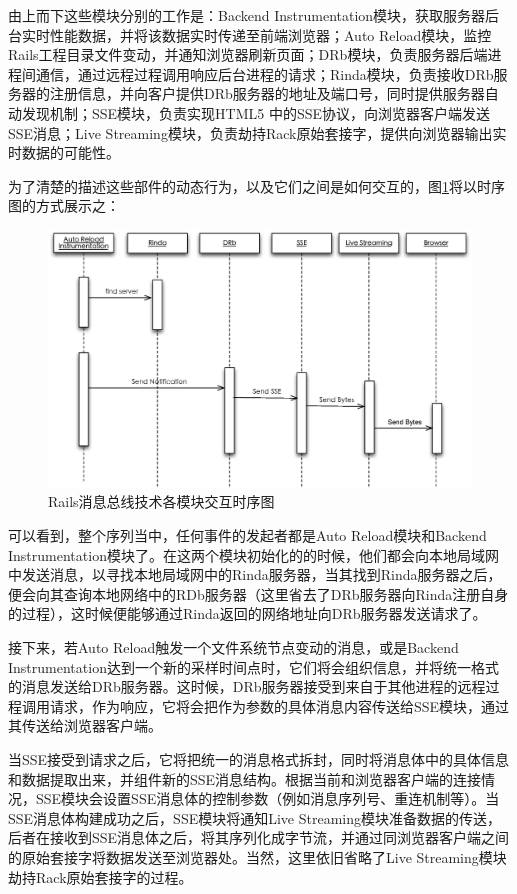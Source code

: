 由上而下这些模块分别的工作是：Backend Instrumentation模块，获取服务器后台实时性能数据，并将该数据实时传递至前端浏览器；Auto Reload模块，监控Rails工程目录文件变动，并通知浏览器刷新页面；DRb模块，负责服务器后端进程间通信，通过远程过程调用响应后台进程的请求；Rinda模块，负责接收DRb服务器的注册信息，并向客户提供DRb服务器的地址及端口号，同时提供服务器自动发现机制；SSE模块，负责实现HTML5 中的SSE协议，向浏览器客户端发送SSE消息；Live Streaming模块，负责劫持Rack原始套接字，提供向浏览器输出实时数据的可能性。

为了清楚的描述这些部件的动态行为，以及它们之间是如何交互的，图\ref{fig-overall-timing}将以时序图的方式展示之：

\begin{figure}[h]
\centering
\includegraphics[width=\textwidth]{images/overview/overall_timing.eps}
\caption{Rails消息总线技术各模块交互时序图}
\label{fig-overall-timing}
\end{figure}

可以看到，整个序列当中，任何事件的发起者都是Auto Reload模块和Backend Instrumentation模块了。在这两个模块初始化的的时候，他们都会向本地局域网中发送消息，以寻找本地局域网中的Rinda服务器，当其找到Rinda服务器之后，便会向其查询本地网络中的RDb服务器（这里省去了DRb服务器向Rinda注册自身的过程），这时候便能够通过Rinda返回的网络地址向DRb服务器发送请求了。

接下来，若Auto Reload触发一个文件系统节点变动的消息，或是Backend Instrumentation达到一个新的采样时间点时，它们将会组织信息，并将统一格式的消息发送给DRb服务器。这时候，DRb服务器接受到来自于其他进程的远程过程调用请求，作为响应，它将会把作为参数的具体消息内容传送给SSE模块，通过其传送给浏览器客户端。

当SSE接受到请求之后，它将把统一的消息格式拆封，同时将消息体中的具体信息和数据提取出来，并组件新的SSE消息结构。根据当前和浏览器客户端的连接情况，SSE模块会设置SSE消息体的控制参数（例如消息序列号、重连机制等）。当SSE消息体构建成功之后，SSE模块将通知Live Streaming模块准备数据的传送，后者在接收到SSE消息体之后，将其序列化成字节流，并通过同浏览器客户端之间的原始套接字将数据发送至浏览器处。当然，这里依旧省略了Live Streaming模块劫持Rack原始套接字的过程。

